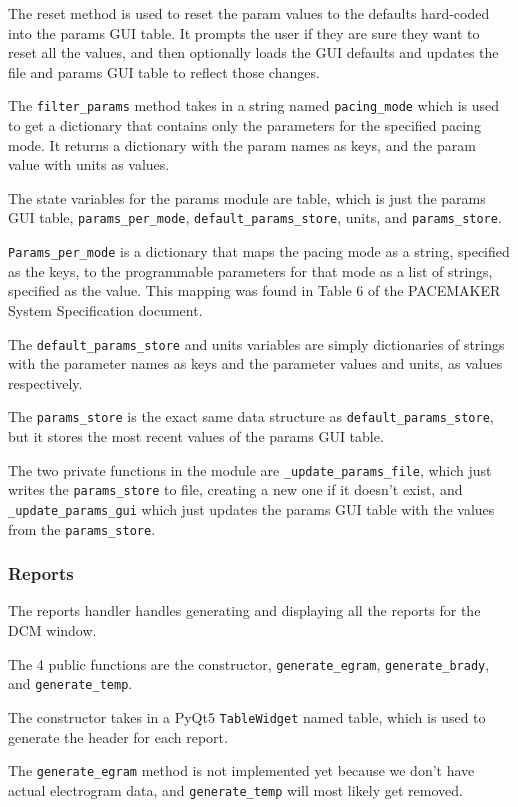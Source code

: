 \documentclass[12pt]{article}
\begin{document}
The reset method is used to reset the param values to the defaults hard-coded into the params GUI table.
It prompts the user if they are sure they want to reset all the values, and then optionally loads the GUI defaults and updates the file and params GUI table to reflect those changes.

The \verb|filter_params| method takes in a string named \verb|pacing_mode| which is used to get a dictionary that contains only the parameters for the specified pacing mode.
It returns a dictionary with the param names as keys, and the param value with units as values.

The state variables for the params module are table, which is just the params GUI table, \verb|params_per_mode|, \verb|default_params_store|, units, and \verb|params_store|.

\verb|Params_per_mode| is a dictionary that maps the pacing mode as a string, specified as the keys, to the programmable parameters for that mode as a list of strings, specified as the value.
This mapping was found in Table 6 of the PACEMAKER System Specification document.

The \verb|default_params_store| and units variables are simply dictionaries of strings with the parameter names as keys and the parameter values and units, as values respectively.

The \verb|params_store| is the exact same data structure as \verb|default_params_store|, but it stores the most recent values of the params GUI table.

The two private functions in the module are \verb|_update_params_file|, which just writes the \verb|params_store| to file, creating a new one if it doesn't exist, and \verb|_update_params_gui| which just updates the params GUI table with the values from the \verb|params_store|.

\subsubsection{Reports}
The reports handler handles generating and displaying all the reports for the DCM window.

The 4 public functions are the constructor, \verb|generate_egram|, \verb|generate_brady|, and \verb|generate_temp|.

The constructor takes in a PyQt5 \verb|TableWidget| named table, which is used to generate the header for each report.

The \verb|generate_egram| method is not implemented yet because we don't have actual electrogram data, and \verb|generate_temp| will most likely get removed.
\end{document}
